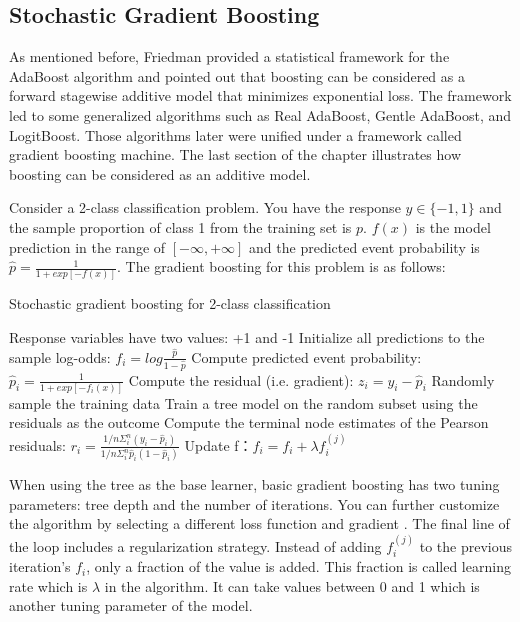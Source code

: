 \documentclass[
  12pt,
]{krantz}
\begin{document}
\hypertarget{stochastic-gradient-boosting}{%
\subsection{Stochastic Gradient Boosting}\label{stochastic-gradient-boosting}}

As mentioned before, Friedman \citep{Friedman2000} provided a statistical framework for the AdaBoost algorithm and pointed out that boosting can be considered as a forward stagewise additive model that minimizes exponential loss. The framework led to some generalized algorithms such as Real AdaBoost, Gentle AdaBoost, and LogitBoost. Those algorithms later were unified under a framework called gradient boosting machine. The last section of the chapter illustrates how boosting can be considered as an additive model.

Consider a 2-class classification problem. You have the response \(y \in \{-1, 1\}\) and the sample proportion of class 1 from the training set is \(p\). \(f(x)\) is the model prediction in the range of \([-\infty, +\infty]\) and the predicted event probability is \(\hat{p}=\frac{1}{1+exp[-f(x)]}\). The gradient boosting for this problem is as follows:

\begin{algorithm}
\caption{Stochastic gradient boosting for 2-class classification}\label{gbmalgorithm} 
\begin{algorithmic}[1] 
\State Response variables have two values: +1 and -1
\State Initialize all  predictions to the sample log-odds: $f_{i} = log \frac{\hat{p}}{1- \hat{p}}$
    \State Compute predicted event probability:  $\hat{p}_i=\frac{1}{1+exp[-f_{i}(x)]}$
    \State Compute the residual (i.e. gradient): $z_i=y_i-\hat{p}_i$
    \State Randomly sample the training data
    \State Train a tree model on the random subset using the residuals as the outcome
    \State Compute the terminal node estimates of the Pearson residuals: $r_i=\frac{1/n\Sigma_i^n(y_i-\hat{p}_i)}{1/n\Sigma_i^n\hat{p}_i(1-\hat{p}_i)}$
    \State Update f：$f_i=f_i+\lambda f_i^{(j)}$
\EndFor
\end{algorithmic}
\end{algorithm}

When using the tree as the base learner, basic gradient boosting has two tuning parameters: tree depth and the number of iterations. You can further customize the algorithm by selecting a different loss function and gradient \citep{Hastie2008}. The final line of the loop includes a regularization strategy. Instead of adding \(f_i^{(j)}\) to the previous iteration's \(f_i\), only a fraction of the value is added. This fraction is called learning rate which is \(\lambda\) in the algorithm. It can take values between 0 and 1 which is another tuning parameter of the model.
\end{document}
